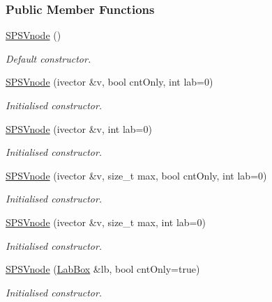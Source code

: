 \subsubsection*{\-Public \-Member \-Functions}
\begin{DoxyCompactItemize}
\item 
\hyperlink{classsubpavings_1_1SPSVnode_a1fac8007420cae9fb27af8e7c81eaa52}{\-S\-P\-S\-Vnode} ()
\begin{DoxyCompactList}\small\item\em \-Default constructor. \end{DoxyCompactList}\item 
\hyperlink{classsubpavings_1_1SPSVnode_a29413a70c5c7f01002665a8319971984}{\-S\-P\-S\-Vnode} (ivector \&v, bool cnt\-Only, int lab=0)
\begin{DoxyCompactList}\small\item\em \-Initialised constructor. \end{DoxyCompactList}\item 
\hyperlink{classsubpavings_1_1SPSVnode_a4d33a48a0510f2988d17ae9c1f56eb1a}{\-S\-P\-S\-Vnode} (ivector \&v, int lab=0)
\begin{DoxyCompactList}\small\item\em \-Initialised constructor. \end{DoxyCompactList}\item 
\hyperlink{classsubpavings_1_1SPSVnode_aa91b89ffdb65468e88ab8cecf290a75d}{\-S\-P\-S\-Vnode} (ivector \&v, size\-\_\-t max, bool cnt\-Only, int lab=0)
\begin{DoxyCompactList}\small\item\em \-Initialised constructor. \end{DoxyCompactList}\item 
\hyperlink{classsubpavings_1_1SPSVnode_a62e88e96ee22be76109b387277ef6955}{\-S\-P\-S\-Vnode} (ivector \&v, size\-\_\-t max, int lab=0)
\begin{DoxyCompactList}\small\item\em \-Initialised constructor. \end{DoxyCompactList}\item 
\hyperlink{classsubpavings_1_1SPSVnode_a22251951e28c6876d4159e82bf2f36e1}{\-S\-P\-S\-Vnode} (\hyperlink{classLabBox}{\-Lab\-Box} \&lb, bool cnt\-Only=true)
\begin{DoxyCompactList}\small\item\em \-Initialised constructor. \end{DoxyCompactList}\item 

\end{DoxyCompactItemize}
